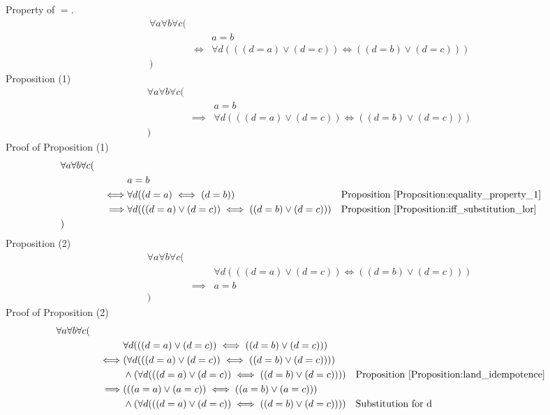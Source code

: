 \begin{prop}
\label{Proposition:equality_property_2}
Property of $=$.
\begin{align*}
& \forall a \forall b \forall c ( \\
& & & a = b \\
& & \iff & \forall d (((d = a) \lor (d = c)) \iff ((d = b) \lor (d = c))) \\
& )
\end{align*}
Proposition (1)
\begin{align*}
& \forall a \forall b \forall c ( \\
& & & a = b \\
& & \implies & \forall d (((d = a) \lor (d = c)) \iff ((d = b) \lor (d = c))) \\
& )
\end{align*}
Proof of Proposition (1)
\begin{align*}
& \forall a \forall b \forall c ( \\
& & & a = b \\
& & \iff & \forall d ((d = a) \iff (d = b))
& & \text{Proposition \ref{Proposition:equality_property_1}} \\
& & \implies & \forall d (((d = a) \lor (d = c)) \iff ((d = b) \lor (d = c)))
& & \text{Proposition \ref{Proposition:iff_substitution_lor}} \\
& )
\end{align*}
Proposition (2)
\begin{align*}
& \forall a \forall b \forall c ( \\
& & & \forall d (((d = a) \lor (d = c)) \iff ((d = b) \lor (d = c))) \\
& & \implies & a = b \\
& )
\end{align*}
Proof of Proposition (2)
\begin{align*}
& \forall a \forall b \forall c ( \\
& & & \forall d (((d = a) \lor (d = c)) \iff ((d = b) \lor (d = c))) \\
& & \iff & (\forall d (((d = a) \lor (d = c)) \iff ((d = b) \lor (d = c)))) \\
& & & \land (\forall d (((d = a) \lor (d = c)) \iff ((d = b) \lor (d = c))))
& & \text{Proposition \ref{Proposition:land_idempotence}} \\
& & \implies & (((a = a) \lor (a = c)) \iff ((a = b) \lor (a = c))) \\
& & & \land (\forall d (((d = a) \lor (d = c)) \iff ((d = b) \lor (d = c))))
& & \text{Substitution for d} \\

\end{align*}
\end{prop}

